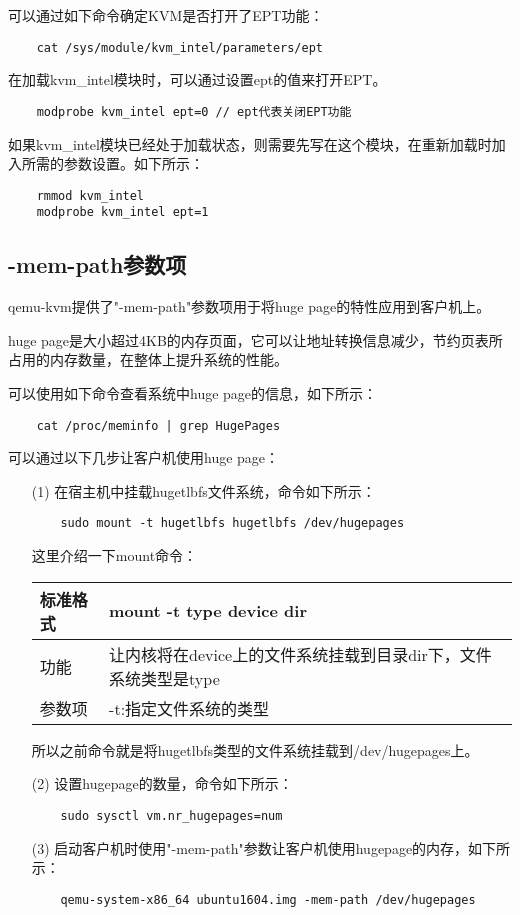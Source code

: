 \documentclass[a4paper,left=2.5cm,right=2.5cm,11pt]{article}
\newcommand{\interval}{\vspace{0.5em}}
\begin{document}
	可以通过如下命令确定KVM是否打开了EPT功能：
	\begin{lstlisting}
	cat /sys/module/kvm_intel/parameters/ept
	\end{lstlisting}

	在加载kvm\_intel模块时，可以通过设置ept的值来打开EPT。
	\begin{lstlisting}
	modprobe kvm_intel ept=0 // ept代表关闭EPT功能
	\end{lstlisting}

	如果kvm\_intel模块已经处于加载状态，则需要先写在这个模块，在重新加载时加入所需的参数设置。如下所示：
	\begin{lstlisting}
	rmmod kvm_intel
	modprobe kvm_intel ept=1
	\end{lstlisting}

\subsection{-mem-path参数项}
	qemu-kvm提供了"-mem-path"参数项用于将huge page的特性应用到客户机上。\par
	huge page是大小超过4KB的内存页面，它可以让地址转换信息减少，节约页表所占用的内存数量，在整体上提升系统的性能。\par
	可以使用如下命令查看系统中huge page的信息，如下所示：
	\begin{lstlisting}
	cat /proc/meminfo | grep HugePages
	\end{lstlisting}

	可以通过以下几步让客户机使用huge page：
	\begin{itemize}
		\item[(1)] 在宿主机中挂载hugetlbfs文件系统，命令如下所示：
		\begin{lstlisting}
	sudo mount -t hugetlbfs hugetlbfs /dev/hugepages
		\end{lstlisting}

		这里介绍一下mount命令：
		\interval
		\begin{longtable}{p{2cm}p{8cm}}
		\hline
		标准格式 & mount -t type device dir \\
		\hline
		功能 & 让内核将在device上的文件系统挂载到目录dir下，文件系统类型是type \\
		\hline
		参数项 & -t:指定文件系统的类型 \\
		\hline
		\end{longtable}
		\interval
		
		所以之前命令就是将hugetlbfs类型的文件系统挂载到/dev/hugepages上。

		\item[(2)] 设置hugepage的数量，命令如下所示：
		\begin{lstlisting}
	sudo sysctl vm.nr_hugepages=num
		\end{lstlisting}

		\item[(3)] 启动客户机时使用"-mem-path"参数让客户机使用hugepage的内存，如下所示：
		\begin{lstlisting}
	qemu-system-x86_64 ubuntu1604.img -mem-path /dev/hugepages
		\end{lstlisting}
	\end{itemize}
\end{document}
